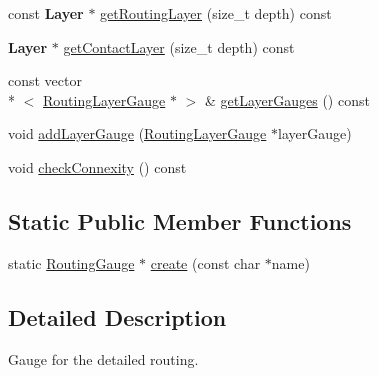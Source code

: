 \begin{DoxyCompactItemize}
const {\bf Layer} $\ast$ \hyperlink{classCRL_1_1RoutingGauge_aaa35c92a1bd8fdf022014b684eab9b40}{get\-Routing\-Layer} (size\-\_\-t depth) const 
\item 
{\bf Layer} $\ast$ \hyperlink{classCRL_1_1RoutingGauge_ab7d83a8694be580a6a4b9aa60adcb0b0}{get\-Contact\-Layer} (size\-\_\-t depth) const 
\item 
const vector\\*
$<$ \hyperlink{classCRL_1_1RoutingLayerGauge}{Routing\-Layer\-Gauge} $\ast$ $>$ \& \hyperlink{classCRL_1_1RoutingGauge_a9e83c61bbac640a14fe7dc37b33f1a27}{get\-Layer\-Gauges} () const 
\item 
void \hyperlink{classCRL_1_1RoutingGauge_a32313fbc68080e0b7e03b3e06dc1d9c5}{add\-Layer\-Gauge} (\hyperlink{classCRL_1_1RoutingLayerGauge}{Routing\-Layer\-Gauge} $\ast$layer\-Gauge)
\item 
void \hyperlink{classCRL_1_1RoutingGauge_a70897b3776ccc713b0a45804b66a1b62}{check\-Connexity} () const 
\end{DoxyCompactItemize}
\subsection*{Static Public Member Functions}
\begin{DoxyCompactItemize}
\item 
static \hyperlink{classCRL_1_1RoutingGauge}{Routing\-Gauge} $\ast$ \hyperlink{classCRL_1_1RoutingGauge_a7258273728f5db47e422d5914c1c36bd}{create} (const char $\ast$name)
\end{DoxyCompactItemize}


\subsection{Detailed Description}
Gauge for the detailed routing. 

